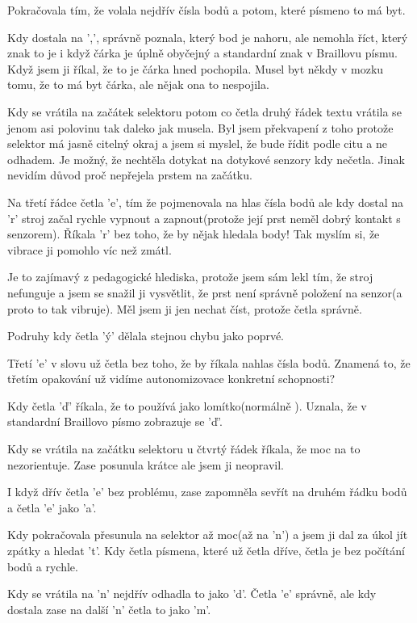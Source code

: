 Pokračovala tím, že volala nejdřív čísla bodů a potom, které písmeno to má byt.

Kdy dostala na ',', správně poznala, který bod je nahoru, ale nemohla říct, který znak to je i když čárka je úplně obyčejný a standardní znak v Braillovu písmu.  Když jsem ji říkal, že to je čárka hned pochopila.  Musel byt někdy v mozku tomu, že to má byt čárka, ale nějak ona to nespojila.

Kdy se vrátila na začátek selektoru potom co četla druhý řádek textu vrátila se jenom asi polovinu tak daleko jak musela.  Byl jsem překvapení z toho protože selektor má jasně citelný okraj a jsem si myslel, že bude řídit podle citu a ne odhadem.  Je možný, že nechtěla dotykat na dotykové senzory kdy nečetla. Jinak nevidím důvod proč nepřejela prstem na začátku.

Na třetí řádce četla 'e', tím že pojmenovala na hlas čísla bodů ale kdy dostal na 'r' stroj začal rychle vypnout a zapnout(protože její prst neměl dobrý kontakt s senzorem).  Říkala 'r' bez toho, že by nějak hledala body!  Tak myslím si, že vibrace ji pomohlo víc než zmátl.

Je to zajímavý z pedagogické hlediska, protože jsem sám lekl tím, že stroj nefunguje a jsem se snažil ji vysvětlit, že prst není správně položení na senzor(a proto to tak vibruje).  Měl jsem ji jen nechat číst, protože četla správně.

Podruhy kdy četla 'ý' dělala stejnou chybu jako poprvé.

Třetí 'e' v slovu  už četla bez toho, že by říkala nahlas čísla bodů.  Znamená to, že třetím opakování už vidíme autonomizovace konkretní schopnosti?

Kdy četla 'ď' říkala, že to používá jako lomítko(normálně ).  Uznala, že v standardní Braillovo písmo zobrazuje se 'ď'.

Kdy se vrátila na začátku selektoru u čtvrtý řádek říkala, že moc na to nezorientuje.  Zase posunula krátce ale jsem ji neopravil.

I když dřív četla 'e' bez problému, zase zapomněla sevřít na druhém řádku bodů a četla 'e' jako 'a'.

Kdy pokračovala přesunula na selektor až moc(až na 'n') a jsem ji dal za úkol jít zpátky a hledat 't'.  Kdy četla písmena, které už četla dříve, četla je bez počítání bodů a rychle.

Kdy se vrátila na 'n' nejdřív odhadla to jako 'd'. Četla 'e' správně, ale kdy dostala zase na další 'n' četla to jako 'm'.

